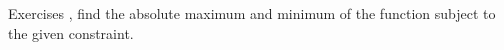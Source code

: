 {\noindent Exercises}
{, find the absolute maximum and minimum of the function subject to the given constraint.
}
